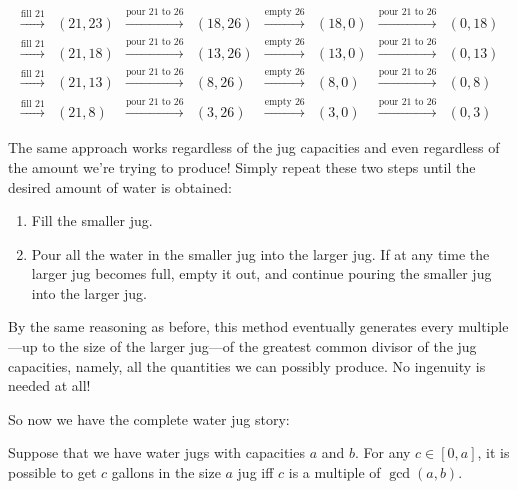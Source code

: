 \[\begin{array}{cccccccc}
\xrightarrow{\text{fill 21}} & (21,23)&
\xrightarrow{\text{pour 21 to 26}} & (18,26)& \xrightarrow{\text{empty
    26}} & (18,0)& \xrightarrow{\text{pour 21 to 26}} &
(0,18)\\
\xrightarrow{\text{fill 21}} & (21,18)&
\xrightarrow{\text{pour 21 to 26}} & (13,26)& \xrightarrow{\text{empty
    26}} & (13,0)& \xrightarrow{\text{pour 21 to 26}} &
(0,13)\\
\xrightarrow{\text{fill 21}} & (21,13)&
\xrightarrow{\text{pour 21 to 26}} & (8,26)& \xrightarrow{\text{empty
    26}} & (8,0)& \xrightarrow{\text{pour 21 to 26}} &
(0,8)\\
\xrightarrow{\text{fill 21}} & (21,8)& \xrightarrow{\text{pour
    21 to 26}} & (3,26)& \xrightarrow{\text{empty 26}} & (3,0)&
\xrightarrow{\text{pour 21 to 26}} & (0,3)
\end{array}
\]

The same approach works regardless of the jug capacities and even
regardless of the amount we're trying to produce!  Simply repeat these
two steps until the desired amount of water is obtained:
\begin{enumerate}
\item Fill the smaller jug.

\item Pour all the water in the smaller jug into the larger jug.  If
  at any time the larger jug becomes full, empty it out, and continue
  pouring the smaller jug into the larger jug.
\end{enumerate}
By the same reasoning as before, this method eventually generates
every multiple---up to the size of the larger jug---of the greatest
common divisor of the jug capacities, namely, all the quantities we
can possibly produce.  No ingenuity is needed at all!

So now we have the complete water jug story:
\begin{theorem}\label{th:waterjugs}
Suppose that we have water jugs with capacities $a$ and $b$.  For any
$c \in [0,a]$, it is possible to get $c$ gallons in the size $a$ jug
iff $c$ is a multiple of $\gcd(a, b)$.
\end{theorem}

